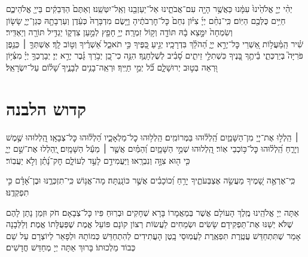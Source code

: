 \begin{footnotesize}
	יְהִ֨י יְיָ֤ אֱלֹהֵ֙ינוּ֙ עִמָּ֔נוּ כַּאֲשֶׁ֥ר הָיָ֖ה עִם־אֲבֹתֵ֑ינוּ אַל־יַעַזְבֵ֖נוּ וְאַֽל־יִטְּשֵֽׁנוּ׃
	וְאַתֶּם֙ הַדְּבֵקִ֔ים בַּייָ֖ אֱלֹהֵיכֶ֑ם חַיִּ֥ים כֻּלְּכֶ֖ם הַיּֽוֹם׃
	כִּֽי־נִחַ֨ם יְיָ֜ צִיּ֗וֹן נִחַם֙ כׇּל־חׇרְבֹתֶ֔יהָ וַיָּ֤שֶׂם מִדְבָּרָהּ֙ כְּעֵ֔דֶן וְעַרְבָתָ֖הּ כְּגַן־יְיָ֑ שָׂשׂ֤וֹן וְשִׂמְחָה֙ יִמָּ֣צֵא בָ֔הּ תּוֹדָ֖ה וְק֥וֹל זִמְרָֽה׃
	יְיָ֥ חָפֵ֖ץ לְמַ֣עַן צִדְק֑וֹ יַגְדִּ֥יל תּוֹרָ֖ה וְיַאְדִּֽיר׃\\
	שִׁ֗יר הַֽמַּ֫עֲל֥וֹת אַ֭שְׁרֵי כׇּל־יְרֵ֣א יְיָ֑ הַ֝הֹלֵ֗ךְ בִּדְרָכָֽיו׃
	יְגִ֣יעַ כַּ֭פֶּיךָ כִּ֣י תֹאכֵ֑ל אַ֝שְׁרֶ֗יךָ וְט֣וֹב לָֽךְ׃
	אֶשְׁתְּךָ֤ ׀ כְּגֶ֥פֶן פֹּרִיָּה֮ בְּיַרְכְּתֵ֢י בֵ֫יתֶ֥ךָ בָּ֭נֶיךָ כִּשְׁתִלֵ֣י זֵיתִ֑ים סָ֝בִ֗יב לְשֻׁלְחָנֶֽךָ׃
	הִנֵּ֣ה כִי־כֵ֭ן יְבֹ֥רַךְ גָּ֗בֶר יְרֵ֣א יְיָ׃
	יְבָרֶכְךָ֥ יְיָ֗ מִצִּ֫יּ֥וֹן וּ֭רְאֵה בְּט֣וּב יְרוּשָׁלָ֑‍ִם כֹּ֗֝ל יְמֵ֣י חַיֶּֽיךָ׃
	וּרְאֵֽה־בָנִ֥ים לְבָנֶ֑יךָ שָׁ֝ל֗וֹם עַל־יִשְׂרָאֵֽל׃
\end{footnotesize}

\section[קדוש הלבנה]{ קדוש הלבנה }

׀ הַֽלְל֣וּ אֶת־יְיָ֭ מִן־הַשָּׁמַ֑יִם הַֽ֝לְל֗וּהוּ בַּמְּרוֹמִֽים׃
הַֽלְל֥וּהוּ כׇל־מַלְאָכָ֑יו הַ֝לְל֗וּהוּ כׇּל־צְבָאָֽו׃
הַֽ֭לְלוּהוּ שֶׁ֣מֶשׁ וְיָרֵ֑חַ הַֽ֝לְל֗וּהוּ כׇּל־כּ֥וֹכְבֵי אֽוֹר׃
הַֽ֭לְלוּהוּ שְׁמֵ֣י הַשָּׁמָ֑יִם וְ֝הַמַּ֗יִם אֲשֶׁ֤ר ׀ מֵעַ֬ל הַשָּׁמָֽיִם׃
יְֽ֭הַלְלוּ אֶת־שֵׁ֣ם יְיָ֑ כִּ֤י ה֖וּא צִוָּ֣ה וְנִבְרָֽאוּ׃
וַיַּעֲמִידֵ֣ם לָעַ֣ד לְעוֹלָ֑ם חׇק־נָ֝תַ֗ן וְלֹ֣א יַעֲבֽוֹר׃

כִּֽי־אֶרְאֶ֣ה שָׁ֭מֶיךָ מַעֲשֵׂ֣ה אֶצְבְּעֹתֶ֑יךָ יָרֵ֥חַ וְ֝כוֹכָבִ֗ים אֲשֶׁ֣ר כּוֹנָֽנְתָּה׃
מָה־אֱנ֥וֹשׁ כִּֽי־תִזְכְּרֶ֑נּוּ וּבֶן־אָ֝דָ֗ם כִּ֣י תִפְקְדֶֽנּוּ׃

\begin{large}
	אַתָּה יְיָ אֱלֹהֵֽינוּ מֶֽלֶךְ הָעוֹלָם אֲשֶׁר בְּמַאֲמָרוֹ בָּרָא שְׁחָקִים וּבְרֽוּחַ פִּיו כׇּל־צְבָאָם׃ חֹק וּזְמַן נָתַן לָהֶם שֶׁלֹּא יְשַׁנּוּ אֶת־תַּפְקִידָם׃ שָׂשִׂים וּשְׂמֵחִים לַעֲשׂוֹת רְצוֹן קוֹנָם פּוֹעֵל אֱמֶת שֶׁפְּעֻלָּתוֹ אֱמֶת׃ וְלַלְּבָנָה אָמַר שֶׁתִּתְחַדֵּשׁ עֲטֶֽרֶת תִּפְאֶֽרֶת לַעֲמֽוּסֵי בָֽטֶן הָעֲתִידִים לְהִתְחַדֵּשׁ כְּמוֹתָהּ וּלְפָאֵר לְיוֹצְרָם עַל שֵׁם כְּבוֹד מַלְכוּתוֹ׃ בָּרוּךְ אַתָּה יְיָ מְחַדֵּשׁ חֳדָשִׁים׃
\end{large}

